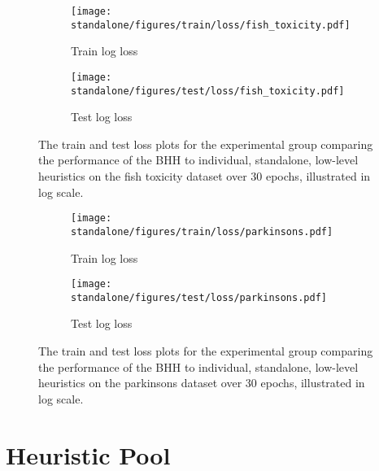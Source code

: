 \begin{figure}[htpb]
      \begin{subfigure}{0.5\textwidth}
            \centering
            \texttt{[image: standalone/figures/train/loss/fish\_toxicity.pdf]}
            \caption{Train log loss}
            \label{fig:results:standalone:figures:loss:train:fish_toxicity}
      \end{subfigure}
      \begin{subfigure}{0.5\textwidth}
            \centering
            \texttt{[image: standalone/figures/test/loss/fish\_toxicity.pdf]}
            \caption{Test log loss}
            \label{fig:results:standalone:figures:loss:test:fish_toxicity}
      \end{subfigure}
      \par\bigskip
      \caption{The train and test loss plots for the experimental group comparing the performance of the \acs{BHH} to individual, standalone, low-level heuristics on the fish toxicity dataset over 30 epochs, illustrated in log scale.}
      \label{fig:results:standalone:figures:fish_toxicity}
\end{figure}


\begin{figure}[htpb]
      \begin{subfigure}{0.5\textwidth}
            \centering
            \texttt{[image: standalone/figures/train/loss/parkinsons.pdf]}
            \caption{Train log loss}
            \label{fig:results:standalone:figures:loss:train:parkinsons}
      \end{subfigure}
      \begin{subfigure}{0.5\textwidth}
            \centering
            \texttt{[image: standalone/figures/test/loss/parkinsons.pdf]}
            \caption{Test log loss}
            \label{fig:results:standalone:figures:loss:test:parkinsons}
      \end{subfigure}
      \par\bigskip
      \caption{The train and test loss plots for the experimental group comparing the performance of the \acs{BHH} to individual, standalone, low-level heuristics on the parkinsons dataset over 30 epochs, illustrated in log scale.}
      \label{fig:results:standalone:figures:parkinsons}
\end{figure}



\section{Heuristic Pool}\label{sec:results:heuristic_pool}

